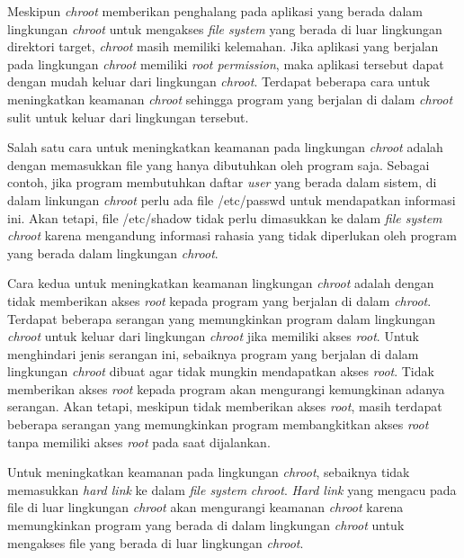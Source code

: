 \par Meskipun \textit{chroot} memberikan penghalang pada aplikasi yang berada dalam lingkungan \textit{chroot} untuk mengakses \textit{file system} yang berada di luar lingkungan direktori target, \textit{chroot} masih memiliki kelemahan. Jika aplikasi yang berjalan pada lingkungan \textit{chroot} memiliki \textit{root permission}, maka aplikasi tersebut dapat dengan mudah keluar dari lingkungan \textit{chroot}. Terdapat beberapa cara untuk meningkatkan keamanan \textit{chroot} sehingga program yang berjalan di dalam \textit{chroot} sulit  untuk keluar dari lingkungan tersebut.

\par Salah satu cara untuk meningkatkan keamanan pada lingkungan \textit{chroot} adalah dengan memasukkan file yang hanya dibutuhkan oleh program saja. Sebagai contoh, jika program membutuhkan daftar \textit{user} yang berada dalam sistem, di dalam linkungan \textit{chroot} perlu ada file /etc/passwd untuk mendapatkan informasi ini. Akan tetapi, file /etc/shadow tidak perlu dimasukkan ke dalam \textit{file system} \textit{chroot} karena mengandung informasi rahasia yang tidak diperlukan oleh program yang berada dalam lingkungan \textit{chroot}.

\par Cara kedua untuk meningkatkan keamanan lingkungan \textit{chroot} adalah dengan tidak memberikan akses \textit{root} kepada program yang berjalan di dalam \textit{chroot}. Terdapat beberapa serangan yang memungkinkan program dalam lingkungan \textit{chroot} untuk keluar dari lingkungan \textit{chroot} jika memiliki akses \textit{root}. Untuk menghindari jenis serangan ini, sebaiknya program yang berjalan di dalam lingkungan \textit{chroot} dibuat agar tidak mungkin mendapatkan akses \textit{root}. Tidak memberikan akses \textit{root} kepada program akan mengurangi kemungkinan adanya serangan. Akan tetapi, meskipun tidak memberikan akses \textit{root}, masih terdapat beberapa serangan yang memungkinkan program membangkitkan akses \textit{root} tanpa memiliki akses \textit{root} pada saat dijalankan.

\par Untuk meningkatkan keamanan pada lingkungan \textit{chroot}, sebaiknya tidak memasukkan \textit{hard link} ke dalam \textit{file system} \textit{chroot}. \textit{Hard link} yang mengacu pada file di luar lingkungan \textit{chroot} akan mengurangi keamanan \textit{chroot} karena memungkinkan program yang berada di dalam lingkungan \textit{chroot} untuk mengakses file yang berada di luar lingkungan \textit{chroot}.

